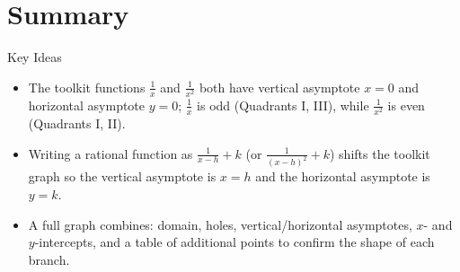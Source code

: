\documentclass[12pt]{article}
\begin{document}
\section*{Summary}

\begin{friendlyrule}{Key Ideas}
\begin{itemize}
    \item The toolkit functions $\frac1x$ and $\frac{1}{x^2}$ both have vertical asymptote $x=0$ and horizontal asymptote $y=0$; $\frac1x$ is odd (Quadrants I, III), while $\frac{1}{x^2}$ is even (Quadrants I, II).
    \item Writing a rational function as $\frac{1}{x-h}+k$ (or $\frac{1}{(x-h)^2}+k$) shifts the toolkit graph so the vertical asymptote is $x=h$ and the horizontal asymptote is $y=k$.
    \item A full graph combines: domain, holes, vertical/horizontal asymptotes, $x$- and $y$-intercepts, and a table of additional points to confirm the shape of each branch.
\end{itemize}
\end{friendlyrule}
\end{document}
